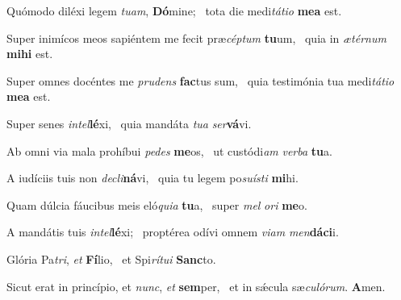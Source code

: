 \item Quómodo diléxi legem \textit{tuam}, \textbf{Dó}mine;~\psstar{} tota die medi\textit{tátio} \textbf{me}\textbf{a} est.

\item Super inimícos meos sapiéntem me fecit præ\textit{céptum} \textbf{tu}um,~\psstar{} quia in \textit{ætérnum} \textbf{mi}\textbf{hi} est.

\item Super omnes docéntes me \textit{prudens} \textbf{fac}tus sum,~\psstar{} quia testimónia tua medi\textit{tátio} \textbf{me}\textbf{a} est.

\item Super senes \textit{intel}\textbf{lé}xi,~\psstar{} quia mandáta \textit{tua} \textit{ser}\textbf{vá}vi.

\item Ab omni via mala prohíbui \textit{pedes} \textbf{me}os,~\psstar{} ut custódi\textit{am} \textit{verba} \textbf{tu}a.

\item A iudíciis tuis non \textit{decli}\textbf{ná}vi,~\psstar{} quia tu legem po\textit{suísti} \textbf{mi}hi.

\item Quam dúlcia fáucibus meis eló\textit{quia} \textbf{tu}a,~\psstar{} super \textit{mel} \textit{ori} \textbf{me}o.

\item A mandátis tuis \textit{intel}\textbf{lé}xi;~\psstar{} proptérea odívi omnem \textit{viam} \textit{men}\textbf{dá}\textbf{ci}i.

\item Glória Pa\textit{tri}, \textit{et} \textbf{Fí}lio,~\psstar{} et Spi\textit{rítui} \textbf{Sanc}to.

\item Sicut erat in princípio, et \textit{nunc}, \textit{et} \textbf{sem}per,~\psstar{} et in sǽcula sæ\textit{culórum}. \textbf{A}men.
